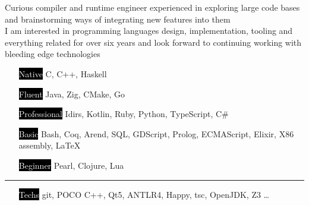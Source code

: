 \documentclass[9pt]{template/developercv}
\begin{document}
\begin{minipage}[t]{0.35\textwidth}
	\vspace{-\baselineskip}

	Curious compiler and runtime engineer experienced in exploring large code bases and brainstorming ways of integrating new features into them\\
	I am interested in programming languages design, implementation, tooling and everything related for over six years and look forward to continuing working with bleeding edge technologies
\end{minipage}
\hfill
\begin{minipage}[t]{0.55\textwidth}
	\vspace{-\baselineskip}
	\vspace{-0.5\baselineskip}

	\begin{itemize}
		\setlength{\itemsep}{0pt}
		\setlength{\parskip}{0.0\baselineskip}
    \setlength{\parsep}{0pt}
		\item[\colorbox{black}{\textcolor{white}{Native}}] C, C++, Haskell
		\item[\colorbox{black}{\textcolor{white}{Fluent}}] Java, Zig, CMake, Go
		\item[\colorbox{black}{\textcolor{white}{Professional}}] Idirs, Kotlin, Ruby, Python, TypeScript, C\#
		\item[\colorbox{black}{\textcolor{white}{Basic}}] Bash, Coq, Arend, SQL, GDScript, Prolog, ECMAScript, Elixir, X86 assembly, \LaTeX
		\item[\colorbox{black}{\textcolor{white}{Beginner}}] Pearl, Clojure, Lua
	\end{itemize}
	\vspace{-0.5\baselineskip}
	\noindent\hspace{-0.1\textwidth}\rule{1.1\textwidth}{0.4pt}
	\begin{itemize}
		\setlength{\itemsep}{0pt}
		\setlength{\parskip}{0.0\baselineskip}
	\setlength{\parsep}{0pt}
		\item[\colorbox{black}{\textcolor{white}{Techs}}] git, POCO C++, Qt5, ANTLR4, Happy, tsc, OpenJDK, Z3 \dots
	\end{itemize}
\end{minipage}


\end{document}

